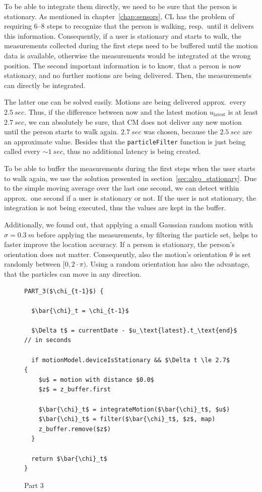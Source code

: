 To be able to integrate them directly, we need to be sure that the person is stationary. As mentioned in chapter~\ref{chap:sensors}, \acs{CL} has the problem of requiring 6--8 steps to recognize that the person is walking, resp.\ until it delivers this information. Consequently, if a user is stationary and starts to walk, the measurements collected during the first steps need to be buffered until the motion data is available, otherwise the measurements would be integrated at the wrong position. The second important information is to know, that a person is now stationary, and no further motions are being delivered. Then, the measurements can directly be integrated.

The latter one can be solved easily. Motions are being delivered approx.\ every $2.5~sec$. Thus, if the difference between now and the latest motion $u_\text{latest}$ is at least $2.7~sec$, we can absolutely be sure, that \acs{CM} does not deliver any new motion until the person starts to walk again. $2.7~sec$ was chosen, because the $2.5~sec$ are an approximate value. Besides that the \texttt{particleFilter} function is just being called every $\sim1~sec$, thus no additional latency is being created.

To be able to buffer the measurements during the first steps when the user starts to walk again, we use the solution presented in section~\ref{sec:algo_stationary}. Due to the simple moving average over the last one second, we can detect within approx.\ one second if a user is stationary or not. If the user is not stationary, the integration is not being executed, thus the values are kept in the buffer.

Additionally, we found out, that applying a small Gaussian random motion with $\sigma = 0.3~m$ before applying the measurements, by filtering the particle set, helps to faster improve the location accuracy. If a person is stationary, the person's orientation does not matter. Consequently, also the motion's orientation $\theta$ is set randomly between $[0, 2 \cdot \pi)$. Using a random orientation has also the advantage, that the particles can move in any direction.

\begin{figure}
\begin{lstlisting}[mathescape]
PART_3($\chi_{t-1}$) {

  $\bar{\chi}_t = \chi_{t-1}$
  
  $\Delta t$ = currentDate - $u_\text{latest}.t_\text{end}$ // in seconds

  if motionModel.deviceIsStationary && $\Delta t \le 2.7$  {
    $u$ = motion with distance $0.0$
    $z$ = z_buffer.first
    
    $\bar{\chi}_t$ = integrateMotion($\bar{\chi}_t$, $u$)
    $\bar{\chi}_t$ = filter($\bar{\chi}_t$, $z$, map)
    z_buffer.remove($z$)
  }
  
  return $\bar{\chi}_t$
}
\end{lstlisting}
\caption{Part 3}
\label{lst:algo_pf_3}
\end{figure}


